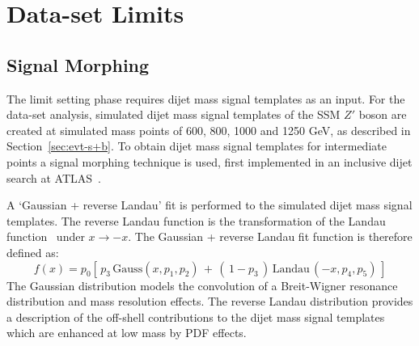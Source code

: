 \FloatBarrier

\section{\lm{} Data-set Limits}
\label{sec:lim-full}

\subsection{Signal Morphing}
\label{sec:lim-full_morphing}

The limit setting phase requires dijet mass signal templates as an input.
For the \lm{} data-set analysis, simulated dijet mass signal templates of the SSM $Z'$ boson are created at simulated mass points of
600, 800, 1000 and 1250 GeV, as described in Section~\ref{sec:evt-s+b}.
To obtain dijet mass signal templates for intermediate points a signal morphing technique is used,
first implemented in an inclusive dijet search at ATLAS~\cite{dijet-mori17_paper}.

A `Gaussian + reverse Landau' fit is performed to the simulated dijet mass signal templates.
The reverse Landau function is the transformation of the Landau function~\cite{lim-landau} under $x\to-x$.
The Gaussian + reverse Landau fit function is therefore defined as:
\begin{equation}
  f(x)=p_0 \left[ \,p_3\,\mathrm{Gauss}\left(x,p_1,p_2\right)\,+\,\left(\,1-p_3\,\right)\,\mathrm{Landau}\,\left(-x,p_4,p_5\right)\, \right]
\end{equation}
The Gaussian distribution models the convolution of a Breit-Wigner resonance distribution and mass resolution effects.
The reverse Landau distribution provides a description of the off-shell contributions to the dijet mass signal templates which are enhanced at low mass by PDF effects.

